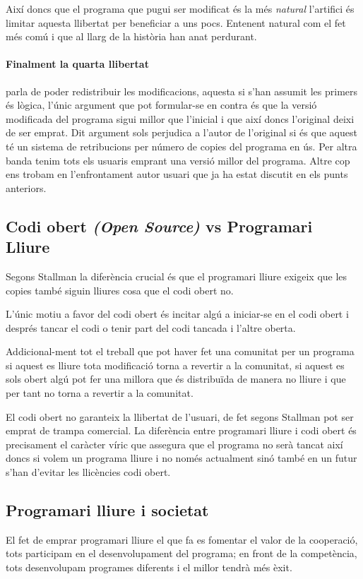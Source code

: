 \documentclass[a4paper,10pt]{scrartcl}
\begin{document}
Així doncs que el programa que pugui ser modificat és la més \emph{natural}
l'artifici és limitar aquesta llibertat per beneficiar a uns pocs.
Entenent natural com el fet més comú i que al llarg de la història
han anat perdurant.

\paragraph{Finalment la quarta llibertat} parla de poder redistribuir les modificacions,
aquesta si s'han assumit les primers és lògica, l'únic argument
que pot formular-se en contra és que la versió modificada del programa
sigui millor que l'inicial i que així doncs l'original deixi de ser
emprat. Dit argument sols perjudica a l'autor de l'original si 
és que aquest té un sistema de retribucions per número de copies del programa
en ús. Per altra banda tenim tots els usuaris emprant una versió millor
del programa. Altre cop ens trobam en l'enfrontament autor usuari
que ja ha estat discutit en els punts anteriors.

\subsection{Codi obert \emph{(Open Source)} vs Programari Lliure}
Segons Stallman la diferència crucial és que el programari lliure exigeix
que les copies també siguin lliures cosa que el codi obert no.

L'únic motiu a favor del codi obert és incitar algú a
iniciar-se en el codi obert i després tancar el codi o tenir part del
codi tancada i l'altre oberta.

Addicional-ment tot el treball que pot haver fet una comunitat per un programa
si aquest es lliure tota modificació torna a revertir a la comunitat,
si aquest es sols obert algú pot fer una millora que és distribuïda 
de manera no lliure i que per tant no torna a revertir a la comunitat.

El codi obert no garanteix la llibertat de l'usuari, de fet segons Stallman
pot ser emprat de trampa comercial. La diferència entre programari lliure
i codi obert és precisament el caràcter víric que assegura que el programa
no serà tancat així doncs si volem un programa lliure i no només actualment
sinó també en un futur s'han d'evitar les llicències codi obert.

\subsection{Programari lliure i societat}
El fet de emprar programari lliure el que fa es fomentar el valor de la cooperació,
tots participam en el desenvolupament del programa; en front de la competència,
tots desenvolupam programes diferents i el millor tendrà més èxit.
\end{document}
